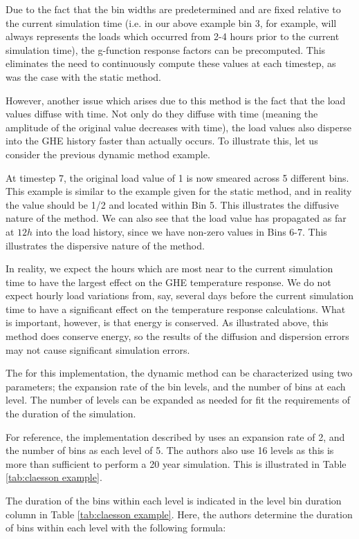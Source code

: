 \documentclass[review,12pt]{elsarticle}
\begin{document}
Due to the fact that the bin widths are predetermined and are fixed relative to the current simulation time (i.e. in our above example bin 3, for example, will always represents the loads which occurred from 2-4 hours prior to the current simulation time), the g-function response factors can be precomputed. This eliminates the need to continuously compute these values at each timestep, as was the case with the static method.

However, another issue which arises due to this method is the fact that the load values diffuse with time. Not only do they diffuse with time (meaning the amplitude of the original value decreases with time), the load values also disperse into the GHE history faster than actually occurs. To illustrate this, let us consider the previous dynamic method example.

At timestep 7, the original load value of 1 is now smeared across 5 different bins. This example is similar to the example given for the static method, and in reality the value should be 1/2 and located within Bin 5. This illustrates the diffusive nature of the method. We can also see that the load value has propagated as far at $12h$ into the load history, since we have non-zero values in Bins 6-7. This illustrates the dispersive nature of the method.

In reality, we expect the hours which are most near to the current simulation time to have the largest effect on the GHE temperature response. We do not expect hourly load variations from, say, several days before the current simulation time to have a significant effect on the temperature response calculations. What is important, however, is that energy is conserved. As illustrated above, this method does conserve energy, so the results of the diffusion and dispersion errors may not cause significant simulation errors.

The for this implementation, the dynamic method can be characterized using two parameters; the expansion rate of the bin levels, and the number of bins at each level. The number of levels can be expanded as needed for fit the requirements of the duration of the simulation.

For reference, the implementation described by \cite{ClaessonJaved2012} uses an expansion rate of 2, and the number of bins as each level of 5. The authors also use 16 levels as this is more than sufficient to perform a 20 year simulation. This is illustrated in Table \ref{tab:claesson example}.

The duration of the bins within each level is indicated in the level bin duration column in Table \ref{tab:claesson example}. Here, the authors determine the duration of bins within each level with the following formula:
\end{document}
